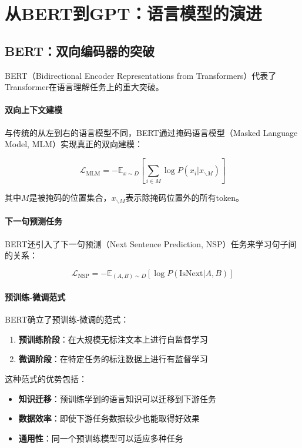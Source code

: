 \section{从BERT到GPT：语言模型的演进}

\subsection{BERT：双向编码器的突破}

BERT（Bidirectional Encoder Representations from Transformers）代表了Transformer在语言理解任务上的重大突破。

\paragraph{双向上下文建模}
与传统的从左到右的语言模型不同，BERT通过掩码语言模型（Masked Language Model, MLM）实现真正的双向建模：

$$\mathcal{L}_{\text{MLM}} = -\mathbb{E}_{x \sim D} \left[ \sum_{i \in M} \log P(x_i | x_{\backslash M}) \right]$$

其中$M$是被掩码的位置集合，$x_{\backslash M}$表示除掩码位置外的所有token。

\paragraph{下一句预测任务}
BERT还引入了下一句预测（Next Sentence Prediction, NSP）任务来学习句子间的关系：

$$\mathcal{L}_{\text{NSP}} = -\mathbb{E}_{(A,B) \sim D} \left[ \log P(\text{IsNext} | A, B) \right]$$

\paragraph{预训练-微调范式}
BERT确立了预训练-微调的范式：
\begin{enumerate}
\item \textbf{预训练阶段}：在大规模无标注文本上进行自监督学习
\item \textbf{微调阶段}：在特定任务的标注数据上进行有监督学习
\end{enumerate}

这种范式的优势包括：
\begin{itemize}
\item \textbf{知识迁移}：预训练学到的语言知识可以迁移到下游任务
\item \textbf{数据效率}：即使下游任务数据较少也能取得好效果
\item \textbf{通用性}：同一个预训练模型可以适应多种任务
\end{itemize}

